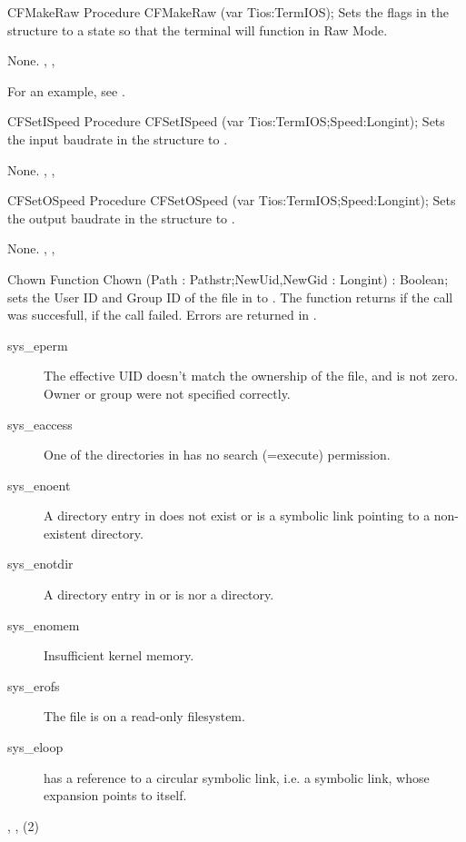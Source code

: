 
\begin{procedure}{CFMakeRaw}
\Declaration
Procedure CFMakeRaw (var Tios:TermIOS);
\Description
  Sets the flags in the  structure  to a state so that 
  the terminal will function in Raw Mode.

\Errors
None.
\SeeAlso
 , , 
\end{procedure}
For an example, see .

\begin{procedure}{CFSetISpeed}
\Declaration
Procedure CFSetISpeed (var Tios:TermIOS;Speed:Longint);
\Description
  Sets the input baudrate in the  structure  to 
  .

\Errors
None.
\SeeAlso
{}, , 
\end{procedure}

\begin{procedure}{CFSetOSpeed}
\Declaration
Procedure CFSetOSpeed (var Tios:TermIOS;Speed:Longint);
\Description
  Sets the output baudrate in the  structure  to
  .

\Errors
None.
\SeeAlso
{}, , 
\end{procedure}

\begin{function}{Chown}
\Declaration
Function Chown (Path : Pathstr;NewUid,NewGid : Longint) : Boolean;
\Description
  sets the User ID and Group ID of the file in  to .
The function returns  if the call was succesfull,  if the call
failed.
\Errors
Errors are returned in .
\begin{description}
\item[sys\_eperm] The effective UID doesn't match the ownership of the file,
and is not zero. Owner or group were not specified correctly.
\item[sys\_eaccess] One of the directories in  has no
search (=execute) permission.
\item[sys\_enoent] A directory entry in  does
not exist or is a symbolic link pointing to a non-existent directory.
\item[sys\_enotdir] A directory entry in  or  is
nor a directory.
\item[sys\_enomem] Insufficient kernel memory.
\item[sys\_erofs] The file is on a read-only filesystem.
\item[sys\_eloop]  has a reference to a circular
symbolic link, i.e. a symbolic link, whose expansion points to itself.
\end{description}
\SeeAlso
{}, , (2)
\end{function}

